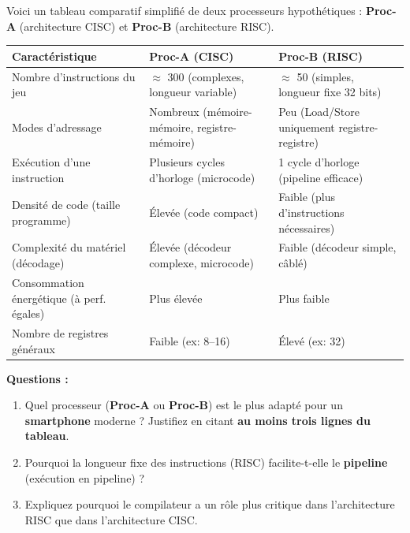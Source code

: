 \documentclass[11pt]{article}
\begin{document}
\begin{exercice}
Voici un tableau comparatif simplifié de deux processeurs hypothétiques : \textbf{Proc-A} (architecture CISC) et \textbf{Proc-B} (architecture RISC).

\begin{center}
\begin{tabularx}{\linewidth}{|l|X|X|}
\hline
\rowcolor{popblueL}
\textbf{Caractéristique} & \textbf{Proc-A (CISC)} & \textbf{Proc-B (RISC)} \\
\hline
Nombre d'instructions du jeu & $\approx$ 300 (complexes, longueur variable) & $\approx$ 50 (simples, longueur fixe 32 bits) \\
\hline
Modes d'adressage & Nombreux (mémoire-mémoire, registre-mémoire) & Peu (Load/Store uniquement registre-registre) \\
\hline
Exécution d'une instruction & Plusieurs cycles d'horloge (microcode) & 1 cycle d'horloge (pipeline efficace) \\
\hline
Densité de code (taille programme) & Élevée (code compact) & Faible (plus d'instructions nécessaires) \\
\hline
Complexité du matériel (décodage) & Élevée (décodeur complexe, microcode) & Faible (décodeur simple, câblé) \\
\hline
Consommation énergétique (à perf. égales) & Plus élevée & Plus faible \\
\hline
Nombre de registres généraux & Faible (ex: 8--16) & Élevé (ex: 32) \\
\hline
\end{tabularx}
\end{center}

\textbf{Questions :}
\begin{enumerate}
    \item Quel processeur (\textbf{Proc-A} ou \textbf{Proc-B}) est le plus adapté pour un \textbf{smartphone} moderne ? Justifiez en citant \textbf{au moins trois lignes du tableau}.
    \item Pourquoi la longueur fixe des instructions (RISC) facilite-t-elle le \textbf{pipeline} (exécution en pipeline) ?
    \item Expliquez pourquoi le compilateur a un rôle plus critique dans l'architecture RISC que dans l'architecture CISC.
\end{enumerate}
\end{exercice}
\end{document}
